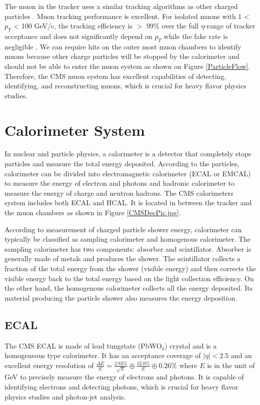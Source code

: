 The muon in the tracker uses a similar tracking algorithms as other charged particles \cite{CMSTrackComp}. Muon tracking performance is excellent. For isolated muons with 1 < $p_T$ < 100 GeV/c, the tracking efficiency is $>$ 99\% over the full $\eta$-range of tracker acceptance and does not significantly depend on $p_T$ while the fake rate is negligible \cite{CMSTrackComp}. We can require hits on the outer most muon chambers to identify muons because other charge particles will be stopped by the calorimeter and should not be able to enter the muon system as shown on Figure \ref{ParticleFlow}. Therefore, the CMS muon system has excellent capabilities of detecting, identifying, and reconstructing muons, which is crucial for heavy flavor physics studies. 

\section{Calorimeter System}

In nuclear and particle physics, a calorimeter is a detector that completely stops particles and measure the total energy deposited. According to the particles, calorimeter can be divided into electromagnetic calorimeter (ECAL or EMCAL) to measure the energy of electron and photons and hadronic calorimeter to measure the energy of charge and neutron hadrons. The CMS calorimeters system includes both ECAL and HCAL. It is located in between the tracker and the muon chambers as shown in Figure \ref{CMSDecPic.jpg}. 

According to measurement of charged particle shower energy, calorimeter can typically be classified as sampling calorimeter and homogenous calorimeter. The sampling calorimeter has two components: absorber and scintillator. Absorber is generally made of metals and produces the shower. The scintillator collects a fraction of the total energy from the shower (visible energy) and then corrects the visible energy back to the total energy based on the light collection efficiency. On the other hand, the homogenous calorimeter collects all the energy deposited. Its material producing the particle shower also measures the energy deposition. 

\subsection{ECAL}

The CMS ECAL is made of lead tungstate (PbWO$_4$) crystal and is a homogeneous type calorimeter. It has an acceptance coverage of $|\eta| < 2.5$ and an excellent energy resolution of $\frac{\Delta E}{E} = \frac{2.83\%}{\sqrt {E}} \oplus \frac{12.0\%}{E}  \oplus 0.26\% $ where $E$ is in the unit of GeV \cite{ECALReso} to precisely measure the energy of electrons and photons. It is capable of identifying electrons and detecting photons, which is crucial for heavy flavor physics studies and photon-jet analysis. 

